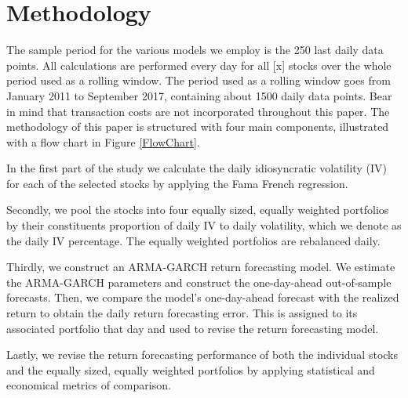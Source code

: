 \chapter{Methodology}
\label{Methodology}

The sample period for the various models we employ is the 250 last daily data points. All calculations are performed every day for all [x] stocks over the whole period used as a rolling window. The period used as a rolling window goes from January 2011 to September 2017, containing about 1500 daily data points. Bear in mind that transaction costs are not incorporated throughout this paper. The methodology of this paper is structured with four main components, illustrated with a flow chart in Figure \ref{FlowChart}.

In the first part of the study we calculate the daily idiosyncratic volatility (IV) for each of the selected stocks by applying the Fama French regression.

Secondly, we pool the stocks into four equally sized, equally weighted portfolios by their constituents proportion of daily IV to daily volatility, which we denote as the daily IV percentage. The equally weighted portfolios are rebalanced daily.

Thirdly, we construct an ARMA-GARCH return forecasting model. We estimate the ARMA-GARCH parameters and construct the one-day-ahead out-of-sample forecasts. Then, we compare the model’s one-day-ahead forecast with the realized return to obtain the daily return forecasting error. This is assigned to its associated portfolio that day and used to revise the return forecasting model. 

Lastly, we revise the return forecasting performance of both the individual stocks and the equally sized, equally weighted portfolios by applying statistical and economical metrics of comparison.

